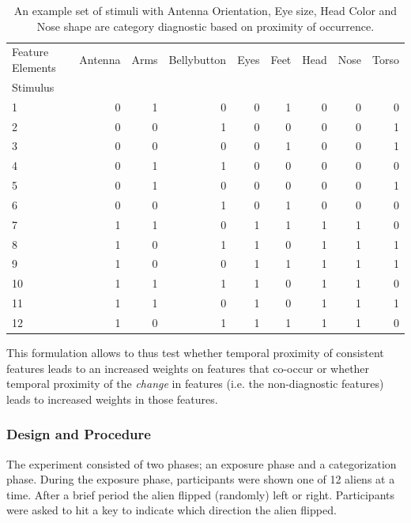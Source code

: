 \begin{table}
\centering
\label{tab:category-features-example}
\caption{An example set of stimuli with Antenna Orientation, Eye size, Head Color and Nose shape are category diagnostic based on proximity of occurrence.}
\begin{tabular}{lrrrrrrrr}
    \toprule
    Feature Elements & Antenna & Arms & Bellybutton & Eyes & Feet & Head & Nose & Torso \\
    Stimulus &  &  &  &  &  &  &  &  \\
    \midrule
    1 & 0 & 1 & 0 & 0 & 1 & 0 & 0 & 0 \\
    2 & 0 & 0 & 1 & 0 & 0 & 0 & 0 & 1 \\
    3 & 0 & 0 & 0 & 0 & 1 & 0 & 0 & 1 \\
    4 & 0 & 1 & 1 & 0 & 0 & 0 & 0 & 0 \\
    5 & 0 & 1 & 0 & 0 & 0 & 0 & 0 & 1 \\
    6 & 0 & 0 & 1 & 0 & 1 & 0 & 0 & 0 \\
    7 & 1 & 1 & 0 & 1 & 1 & 1 & 1 & 0 \\
    8 & 1 & 0 & 1 & 1 & 0 & 1 & 1 & 1 \\
    9 & 1 & 0 & 0 & 1 & 1 & 1 & 1 & 1 \\
    10 & 1 & 1 & 1 & 1 & 0 & 1 & 1 & 0 \\
    11 & 1 & 1 & 0 & 1 & 0 & 1 & 1 & 1 \\
    12 & 1 & 0 & 1 & 1 & 1 & 1 & 1 & 0 \\
    \bottomrule
\end{tabular}

\end{table}

This formulation allows to thus test whether temporal proximity of consistent features leads to an increased weights on features that co-occur or whether temporal proximity of the \textit{change} in features (i.e. the non-diagnostic features) leads to increased weights in those features. 

        
\subsubsection*{Design and Procedure}

The experiment consisted of two phases; an exposure phase and a categorization phase. During the exposure phase, participants were shown one of 12 aliens at a time. After a brief period the alien flipped (randomly) left or right. Participants were asked to hit a key to indicate which direction the alien flipped. 

